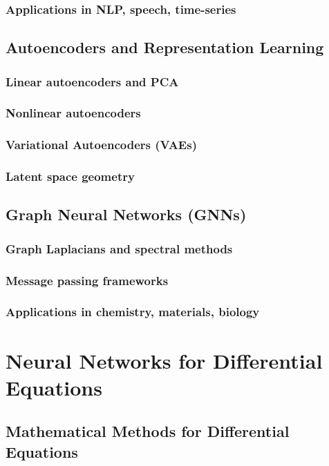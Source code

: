 \section{Applications in NLP, speech, time-series}

\chapter{Autoencoders and Representation Learning}
\section{Linear autoencoders and PCA}
\section{Nonlinear autoencoders}
\section{Variational Autoencoders (VAEs)}
\section{Latent space geometry}

\chapter{Graph Neural Networks (GNNs)}
\section{Graph Laplacians and spectral methods}
\section{Message passing frameworks}
\section{Applications in chemistry, materials, biology}

\part{Neural Networks for Differential Equations}

\chapter{Mathematical Methods for Differential Equations}
